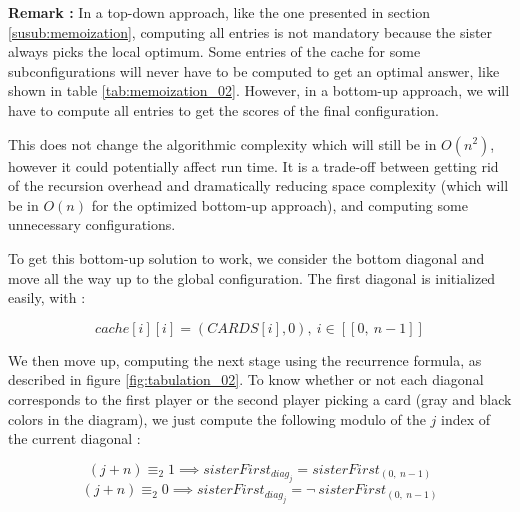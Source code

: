 \documentclass[a4paper,12pt,fleqn]{article}
\newcommand\ezskip{\medskip\noindent}
\begin{document}
\textbf{Remark :} In a top-down approach, like the one presented in section \ref{susub:memoization}, computing all entries is not mandatory because the sister always picks the local optimum. Some entries of the cache for some subconfigurations will never have to be computed to get an optimal answer, like shown in table \ref{tab:memoization_02}. However, in a bottom-up approach, we will have to compute all entries to get the scores of the final configuration.

\medskip
This does not change the algorithmic complexity which will still be in $O(n^2)$, however it could potentially affect run time. It is a trade-off between getting rid of the recursion overhead and dramatically reducing space complexity (which will be in $O(n)$ for the optimized bottom-up approach), and computing some unnecessary configurations.

\newpage

\ezskip
To get this bottom-up solution to work, we consider the bottom diagonal and move all the way up to the global configuration.
The first diagonal is initialized easily, with :

\begin{equation}
cache[i][i] = (CARDS[i], 0), \ i \in [\![0,\ n-1]\!] 
\end{equation}

We then move up, computing the next stage using the recurrence formula, as described in figure \ref{fig:tabulation_02}. To know whether or not each diagonal corresponds to the first player or the second player picking a card (gray and black colors in the diagram), we just compute the following modulo of the $j$ index of the current diagonal :

\begin{equation}
(j + n) \equiv_{2} 1 \implies sisterFirst_{diag_j} = sisterFirst_{(0,\ n-1)}
\end{equation}
\begin{equation}
(j + n) \equiv_{2} 0 \implies sisterFirst_{diag_j} = \neg \ sisterFirst_{(0,\ n-1)}
\end{equation}
\end{document}
